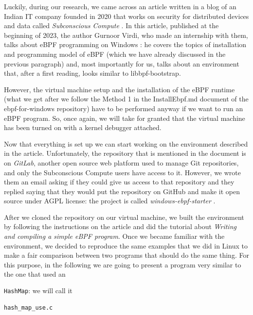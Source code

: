Luckily, during our research, we came across an article written in a blog of an Indian IT company founded in 2020 that works on security for distributed devices and data called \textit{Subconscious Compute} \cite{SubComWebsite}.
In this article, published at the beginning of 2023, the author Gurnoor Virdi, who made an internship with them, talks about eBPF programming on Windows \cite{eBPFWinSubComBlogArticle}: he covers the topics of installation and programming model of eBPF (which we have already discussed in the previous paragraph) and, most importantly for us, talks about an environment that, after a first reading, looks similar to libbpf-bootstrap.

However, the virtual machine setup and the installation of the eBPF runtime (what we get after we follow the Method 1 in the InstallEbpf.md document of the ebpf-for-windows repository) have to be performed anyway if we want to run an eBPF program.
So, once again, we will take for granted that the virtual machine has been turned on with a kernel debugger attached.

Now that everything is set up we can start working on the environment described in the article.
Unfortunately, the repository that is mentioned in the document is on \textit{GitLab}, another open source web platform used to manage Git repositories, and only the Subconscious Compute users have access to it.
However, we wrote them an email asking if they could give us access to that repository and they replied saying that they would put the repository on GitHub and make it open source under AGPL license: the project is called \textit{windows-ebpf-starter} \cite{WineBPFStarterRepo}.

After we cloned the repository on our virtual machine, we built the environment by following the instructions on the article and did the tutorial about \textit{Writing and compiling a simple eBPF program}.
Once we became familiar with the environment, we decided to reproduce the same examples that we did in Linux to make a fair comparison between two programs that should do the same thing.
For this purpose, in the following we are going to present a program very similar to the one that used an \raggedright\colorbox{backcolour}{\lstinline[style=commandline, language=bash]|HashMap|}: we will call it \raggedright\colorbox{backcolour}{\lstinline[style=commandline, language=bash]|hash_map_use.c|}

